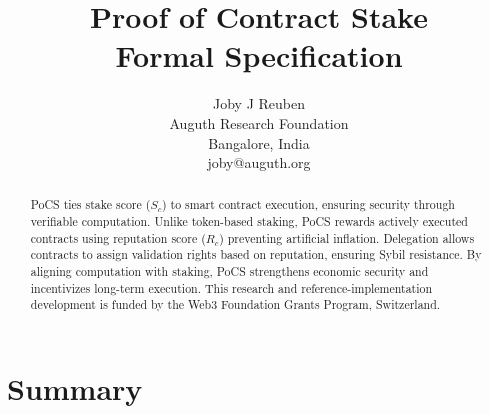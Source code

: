 \documentclass{article}
\begin{document}
\title{Proof of Contract Stake \\ Formal Specification}

\author{Joby J Reuben \\
Auguth Research Foundation \\
Bangalore, India \\
joby@auguth.org
}

\maketitle

\begin{abstract}  
    PoCS ties stake score (\( S_c \)) to smart contract execution, ensuring security through verifiable computation. Unlike token-based staking, PoCS rewards actively executed contracts using reputation score (\( R_c \)) preventing artificial inflation. Delegation allows contracts to assign validation rights based on reputation, ensuring Sybil resistance. By aligning computation with staking, PoCS strengthens economic security and incentivizes long-term execution. This research and reference-implementation development is funded by the Web3 Foundation Grants Program, Switzerland.  
\end{abstract}
    
\section{Summary} \label{Summary}
\end{document}
